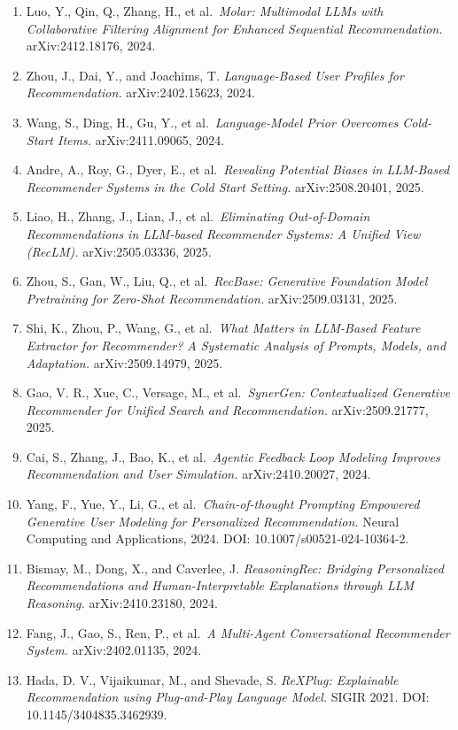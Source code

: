 \begin{enumerate}
\item
  Luo, Y., Qin, Q., Zhang, H., et al.~\emph{Molar: Multimodal LLMs with Collaborative Filtering Alignment for Enhanced Sequential Recommendation.} arXiv:2412.18176, 2024.
\item
  Zhou, J., Dai, Y., and Joachims, T. \emph{Language-Based User Profiles for Recommendation.} arXiv:2402.15623, 2024.
\item
  Wang, S., Ding, H., Gu, Y., et al.~\emph{Language-Model Prior Overcomes Cold-Start Items.} arXiv:2411.09065, 2024.
\item
  Andre, A., Roy, G., Dyer, E., et al.~\emph{Revealing Potential Biases in LLM-Based Recommender Systems in the Cold Start Setting.} arXiv:2508.20401, 2025.
\item
  Liao, H., Zhang, J., Lian, J., et al.~\emph{Eliminating Out-of-Domain Recommendations in LLM-based Recommender Systems: A Unified View (RecLM).} arXiv:2505.03336, 2025.
\item
  Zhou, S., Gan, W., Liu, Q., et al.~\emph{RecBase: Generative Foundation Model Pretraining for Zero-Shot Recommendation.} arXiv:2509.03131, 2025.
\item
  Shi, K., Zhou, P., Wang, G., et al.~\emph{What Matters in LLM-Based Feature Extractor for Recommender? A Systematic Analysis of Prompts, Models, and Adaptation.} arXiv:2509.14979, 2025.
\item
  Gao, V. R., Xue, C., Versage, M., et al.~\emph{SynerGen: Contextualized Generative Recommender for Unified Search and Recommendation.} arXiv:2509.21777, 2025.
\item
  Cai, S., Zhang, J., Bao, K., et al.~\emph{Agentic Feedback Loop Modeling Improves Recommendation and User Simulation.} arXiv:2410.20027, 2024.
\item
  Yang, F., Yue, Y., Li, G., et al.~\emph{Chain-of-thought Prompting Empowered Generative User Modeling for Personalized Recommendation.} Neural Computing and Applications, 2024. DOI: 10.1007/s00521-024-10364-2.
\item
  Bismay, M., Dong, X., and Caverlee, J. \emph{ReasoningRec: Bridging Personalized Recommendations and Human-Interpretable Explanations through LLM Reasoning.} arXiv:2410.23180, 2024.
\item
  Fang, J., Gao, S., Ren, P., et al.~\emph{A Multi-Agent Conversational Recommender System.} arXiv:2402.01135, 2024.
\item
  Hada, D. V., Vijaikumar, M., and Shevade, S. \emph{ReXPlug: Explainable Recommendation using Plug-and-Play Language Model.} SIGIR 2021. DOI: 10.1145/3404835.3462939.

\end{enumerate}
